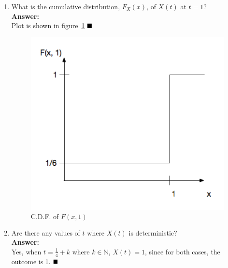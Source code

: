 \begin{enumerate}
  \item  What is the cumulative distribution, $F_X (x)$, of $X(t)$ at $t=1$?\\
    \textbf{Answer:}\\
    Plot is shown in figure~\ref{fig:prob3c} $\hfill\blacksquare$
    \begin{figure}[!h]
      \begin{center}
        \includegraphics[width=5in]{pics/problem3(c).png}
      \end{center}
      \caption{C.D.F. of $F(x, 1)$}
      \label{fig:prob3c}
    \end{figure}
  \item  Are there any values of $t$ where $X(t)$ is deterministic?\\
    \textbf{Answer:}\\
    Yes, when $t = \frac{1}{4} + k$ where $k \in \mathbb{N}$, $X(t) = 1$, since for both cases,
    the outcome is 1. $\hfill\blacksquare$
  \end{enumerate}

